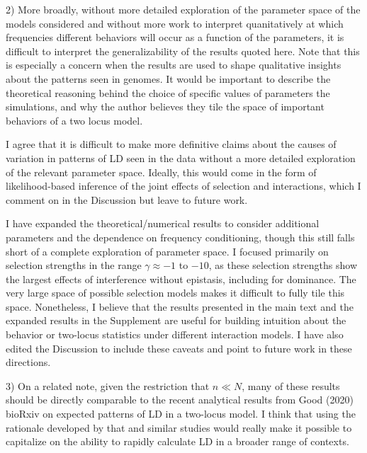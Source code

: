 \documentclass{article}
\newenvironment{response}%
  {\list{}{\leftmargin=0.5in\rightmargin=0.5in\color{blue}}\item[]}%
  {\endlist}
\begin{document}
2) More broadly, without more detailed exploration of the parameter space of
the models considered and without more work to interpret quanitatively at which
frequencies different behaviors will occur as a function of the parameters, it
is difficult to interpret the generalizability of the results quoted here. Note
that this is especially a concern when the results are used to shape
qualitative insights about the patterns seen in genomes. It would be important
to describe the theoretical reasoning behind the choice of specific values of
parameters the simulations, and why the author believes they tile the space of
important behaviors of a two locus model.

\begin{response}
    I agree that it is difficult to make more definitive claims about the
    causes of variation in patterns of LD seen in the data without a more
    detailed exploration of the relevant parameter space. Ideally, this would
    come in the form of likelihood-based inference of the joint effects of 
    selection and interactions, which I comment on in the Discussion but leave
    to future work.

    I have expanded the theoretical/numerical results to consider additional
    parameters and the dependence on frequency conditioning, though this still
    falls short of a complete exploration of parameter space. I focused primarily
    on selection strengths in the range $\gamma\approx -1$ to $-10$, as these
    selection strengths show the largest effects of interference without 
    epistasis, including for dominance. The very large space of possible selection
    models makes it difficult to fully tile this space. Nonetheless, I
    believe that the results presented in the main text and the expanded results
    in the Supplement are useful for building intuition about the behavior or
    two-locus statistics under different interaction models.
    I have also edited the Discussion to include these caveats and
    point to future work in these directions.
\end{response}

3) On a related note, given the restriction that $n \ll N$, many of these
results should be directly comparable to the recent analytical results from
Good (2020) bioRxiv on expected patterns of LD in a two-locus model. I think
that using the rationale developed by that and similar studies would really
make it possible to capitalize on the ability to rapidly calculate LD in a
broader range of contexts.
\end{document}
